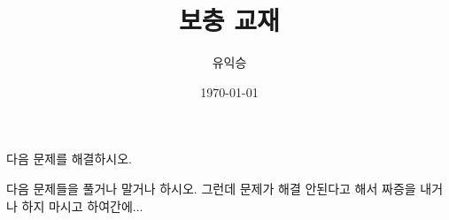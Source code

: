 \documentclass[11pt, b4paper]{book}
\title{보충 교재}
\author{유익승}
\date{\today}
\begin{document}
	
	
\setlength{\columnseprule}{0.2pt}
	\begin{multicols*}{2}
		\begin{problem}
				다음 문제를 해결하시오.
		\end{problem}
	
\columnbreak

\begin{problem}
	다음 문제들을 풀거나 말거나 하시오. 그런데 문제가 해결 안된다고 해서 짜증을 내거나 하지 마시고 하여간에...
\end{problem}
		

	\end{multicols*}
\end{document}
